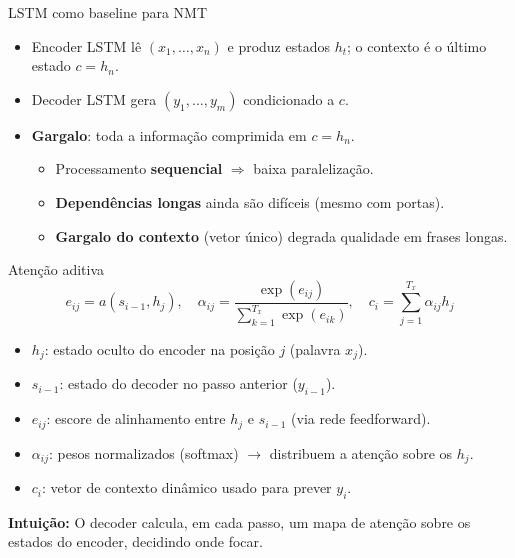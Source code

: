 \documentclass{beamer}
\begin{document}
\begin{frame}{LSTM como baseline para NMT}
	\begin{itemize}
		\item Encoder LSTM lê $(x_1,\dots,x_n)$ e produz estados $h_t$; o contexto é o último estado $c=h_n$.
		\item Decoder LSTM gera $(y_1,\dots,y_m)$ condicionado a $c$.
	\end{itemize}
	\begin{itemize}
		\item \textbf{Gargalo}: toda a informação comprimida em $c=h_n$.
		\begin{itemize}
			\item Processamento \textbf{sequencial} $\Rightarrow$ baixa paralelização.
			\item \textbf{Dependências longas} ainda são difíceis (mesmo com portas).
			\item \textbf{Gargalo do contexto} (vetor único) degrada qualidade em frases longas.
		\end{itemize}
	\end{itemize}
\end{frame}

\begin{frame}{Atenção aditiva \cite{bahdanau2014neural}}
\[
e_{ij} = a(s_{i-1}, h_j), \quad
\alpha_{ij} = \frac{\exp(e_{ij})}{\sum_{k=1}^{T_x} \exp(e_{ik})}, \quad
c_i = \sum_{j=1}^{T_x} \alpha_{ij} h_j
\]

\begin{itemize}
  \item $h_j$: estado oculto do encoder na posição $j$ (palavra $x_j$).
  \item $s_{i-1}$: estado do decoder no passo anterior ($y_{i-1}$).
  \item $e_{ij}$: escore de alinhamento entre $h_j$ e $s_{i-1}$ (via rede feedforward).
  \item $\alpha_{ij}$: pesos normalizados (softmax) $\to$ distribuem a atenção sobre os $h_j$.
  \item $c_i$: vetor de contexto dinâmico usado para prever $y_i$.
\end{itemize}

\textbf{Intuição:} O decoder calcula, em cada passo, um mapa de atenção sobre os estados do encoder, decidindo onde focar.
\end{frame}
\end{document}
